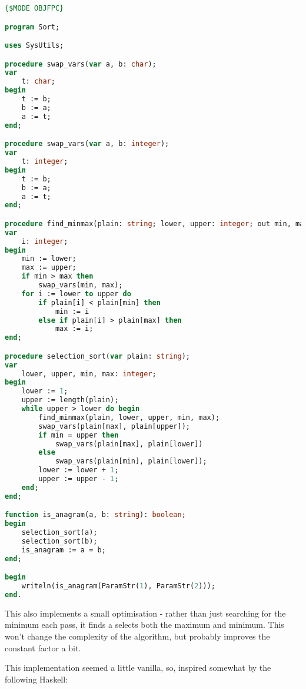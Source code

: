 \documentclass{article}
\begin{document}
\begin{lstlisting}[language=Pascal, caption=Initial selection sort]
{$MODE OBJFPC}

program Sort;

uses SysUtils;

procedure swap_vars(var a, b: char);
var
    t: char;
begin
    t := b;
    b := a;
    a := t;
end;

procedure swap_vars(var a, b: integer);
var
    t: integer;
begin
    t := b;
    b := a;
    a := t;
end;

procedure find_minmax(plain: string; lower, upper: integer; out min, max: integer);
var
    i: integer;
begin
    min := lower;
    max := upper;
    if min > max then
        swap_vars(min, max);
    for i := lower to upper do
        if plain[i] < plain[min] then
            min := i
        else if plain[i] > plain[max] then
            max := i;
end;

procedure selection_sort(var plain: string);
var
    lower, upper, min, max: integer;
begin
    lower := 1;
    upper := length(plain);
    while upper > lower do begin
        find_minmax(plain, lower, upper, min, max);
        swap_vars(plain[max], plain[upper]);
        if min = upper then
            swap_vars(plain[max], plain[lower])
        else
            swap_vars(plain[min], plain[lower]);
        lower := lower + 1;
        upper := upper - 1;
    end;
end;

function is_anagram(a, b: string): boolean;
begin
    selection_sort(a);
    selection_sort(b);
    is_anagram := a = b;
end;

begin
    writeln(is_anagram(ParamStr(1), ParamStr(2)));
end.
\end{lstlisting}
\iffalse $ \fi %

    This also implements a small optimisation - rather than just searching for
    the minimum each pass, it finds a selects both the maximum and minimum.
    This won't change the complexity of the algorithm, but probably improves
    the constant factor a bit.

    This implementation seemed a little vanilla, so, inspired somewhat by the
    following Haskell:
\end{document}
